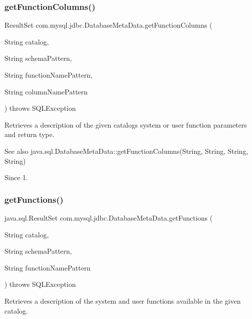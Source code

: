 \subsubsection{\texorpdfstring{get\+Function\+Columns()}{getFunctionColumns()}}
{\footnotesize\ttfamily Result\+Set com.\+mysql.\+jdbc.\+Database\+Meta\+Data.\+get\+Function\+Columns (\begin{DoxyParamCaption}\item[{String}]{catalog,  }\item[{String}]{schema\+Pattern,  }\item[{String}]{function\+Name\+Pattern,  }\item[{String}]{column\+Name\+Pattern }\end{DoxyParamCaption}) throws S\+Q\+L\+Exception}

Retrieves a description of the given catalog\textquotesingle{}s system or user function parameters and return type.

\begin{DoxySeeAlso}{See also}
java.\+sql.\+Database\+Meta\+Data\+::get\+Function\+Columns(\+String, String, String, String) 
\end{DoxySeeAlso}
\begin{DoxySince}{Since}
1. 
\end{DoxySince}
\mbox{\label{classcom_1_1mysql_1_1jdbc_1_1_database_meta_data_a01609207bf0f104ae316e507c1250ec5}} 
\subsubsection{\texorpdfstring{get\+Functions()}{getFunctions()}}
{\footnotesize\ttfamily java.\+sql.\+Result\+Set com.\+mysql.\+jdbc.\+Database\+Meta\+Data.\+get\+Functions (\begin{DoxyParamCaption}\item[{String}]{catalog,  }\item[{String}]{schema\+Pattern,  }\item[{String}]{function\+Name\+Pattern }\end{DoxyParamCaption}) throws S\+Q\+L\+Exception}

Retrieves a description of the system and user functions available in the given catalog. 

